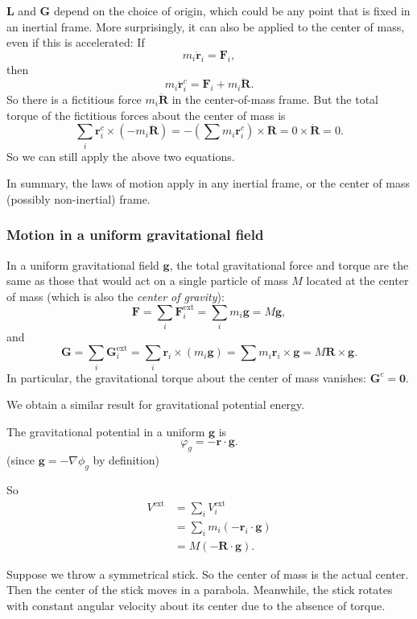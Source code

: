 \documentclass[a4paper]{article}
\begin{document}
$\mathbf{L}$ and $\mathbf{G}$ depend on the choice of origin, which could be any point that is fixed in an inertial frame. More surprisingly, it can also be applied to the center of mass, even if this is accelerated:
If
\[
  m_i \ddot{\mathbf{r}}_i = \mathbf{F}_i,
\]
then
\[
  m_i \ddot{\mathbf{r}}_i^c = \mathbf{F}_i + m_i \ddot{\mathbf{R}}.
\]
So there is a fictitious force $m_i \ddot{\mathbf{R}}$ in the center-of-mass frame. But the total torque of the fictitious forces about the center of mass is
\[
  \sum_i \mathbf{r}_i^c \times \left(-m_i \ddot{\mathbf{R}}\right) = -\left(\sum m_i \mathbf{r}_i^c\right) \times \ddot{\mathbf{R}} = 0\times \dot{\mathbf{R}} = 0.
\]
So we can still apply the above two equations.

In summary, the laws of motion apply in any inertial frame, or the center of mass (possibly non-inertial) frame.

\subsubsection*{Motion in a uniform gravitational field}
In a uniform gravitational field $\mathbf{g}$, the total gravitational force and torque are the same as those that would act on a single particle of mass $M$ located at the center of mass (which is also the \emph{center of gravity}):
\[
  \mathbf{F} = \sum_i \mathbf{F}_i^{\mathrm{ext}} = \sum_i m_i \mathbf{g} = M\mathbf{g},
\]
and
\[
  \mathbf{G} = \sum_i \mathbf{G}_i^{\mathrm{ext}} = \sum_i \mathbf{r}_i \times (m_i \mathbf{g}) = \sum m_i \mathbf{r}_i \times \mathbf{g} = M\mathbf{R}\times \mathbf{g}.
\]
In particular, the gravitational torque about the center of mass vanishes: $\mathbf{G}^c = \mathbf{0}$.

We obtain a similar result for gravitational potential energy.

The gravitational potential in a uniform $\mathbf{g}$ is
\[
  \varphi_g = -\mathbf{r}\cdot \mathbf{g}.
\]
(since $\mathbf{g} = -\nabla \phi_g$ by definition)

So
\begin{align*}
  V^{\mathrm{ext}} &= \sum_i V_i^{\mathrm{ext}}\\
  &= \sum_i m_i (- \mathbf{r}_i \cdot \mathbf{g})\\
  &= M (-\mathbf{R}\cdot \mathbf{g}).
\end{align*}

\begin{eg}
  Suppose we throw a symmetrical stick. So the center of mass is the actual center. Then the center of the stick moves in a parabola. Meanwhile, the stick rotates with constant angular velocity about its center due to the absence of torque.
\end{eg}
\end{document}
